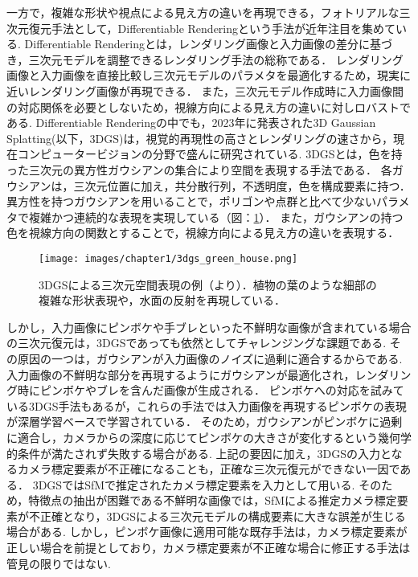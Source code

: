 一方で，複雑な形状や視点による見え方の違いを再現できる，フォトリアルな三次元復元手法として，Differentiable Renderingという手法が近年注目を集めている.
Differentiable Renderingとは，レンダリング画像と入力画像の差分に基づき，三次元モデルを調整できるレンダリング手法の総称である\cite{differentiable_rendering}．
レンダリング画像と入力画像を直接比較し三次元モデルのパラメタを最適化するため，現実に近いレンダリング画像が再現できる．
また，三次元モデル作成時に入力画像間の対応関係を必要としないため，視線方向による見え方の違いに対しロバストである.
Differentiable Renderingの中でも，2023年に発表された3D Gaussian Splatting(以下，3DGS)\cite{3dgs}は，視覚的再現性の高さとレンダリングの速さから，現在コンピュータービジョンの分野で盛んに研究されている.
3DGSとは，色を持った三次元の異方性ガウシアンの集合により空間を表現する手法である．
各ガウシアンは，三次元位置に加え，共分散行列，不透明度，色を構成要素に持つ．
異方性を持つガウシアンを用いることで，ポリゴンや点群と比べて少ないパラメタで複雑かつ連続的な表現を実現している（図：\ref{fig:green-house}）．
また，ガウシアンの持つ色を視線方向の関数とすることで，視線方向による見え方の違いを表現する．\par

\begin{figure}[h]
    \centering
    \texttt{[image: images/chapter1/3dgs\_green\_house.png]}
    \caption[3DGSによる三次元空間表現の例]{3DGSによる三次元空間表現の例（\cite{green-house}より）．植物の葉のような細部の複雑な形状表現や，水面の反射を再現している．}
    \label{fig:green-house}
\end{figure}

しかし，入力画像にピンボケや手ブレといった不鮮明な画像が含まれている場合の三次元復元は，3DGSであっても依然としてチャレンジングな課題である.
その原因の一つは，ガウシアンが入力画像のノイズに過剰に適合するからである.
入力画像の不鮮明な部分を再現するようにガウシアンが最適化され，レンダリング時にピンボケやブレを含んだ画像が生成される．
ピンボケへの対応を試みている3DGS手法\cite{Deblurring3dgs}\cite{BAGS}もあるが，これらの手法では入力画像を再現するピンボケの表現が深層学習ベースで学習されている．
そのため，ガウシアンがピンボケに過剰に適合し，カメラからの深度に応じてピンボケの大きさが変化するという幾何学的条件が満たされず失敗する場合がある.
上記の要因に加え，3DGSの入力となるカメラ標定要素が不正確になることも，正確な三次元復元ができない一因である．
3DGSではSfMで推定されたカメラ標定要素を入力として用いる.
そのため，特徴点の抽出が困難である不鮮明な画像では，SfMによる推定カメラ標定要素が不正確となり，3DGSによる三次元モデルの構成要素に大きな誤差が生じる場合がある.
しかし，ピンボケ画像に適用可能な既存手法は，カメラ標定要素が正しい場合を前提としており，カメラ標定要素が不正確な場合に修正する手法は管見の限りではない.\par

